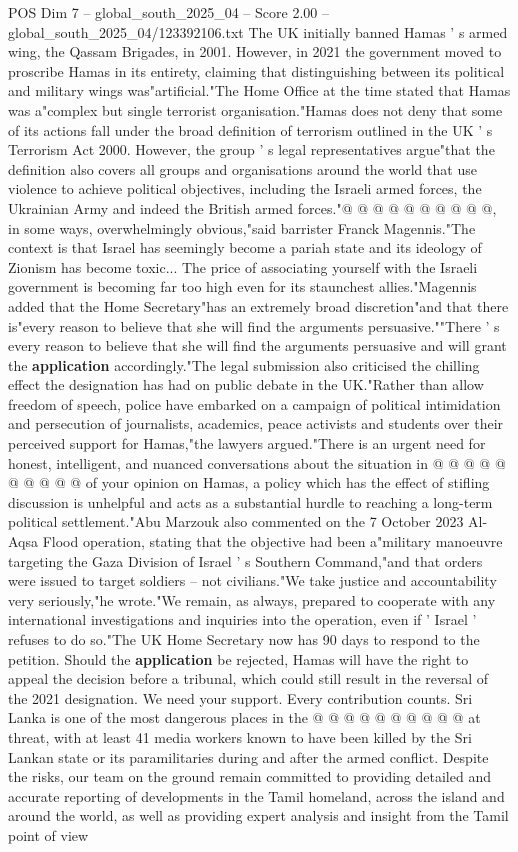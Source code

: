 \begin{textsample}{POS Dim 7 – global\_south\_2025\_04 – Score 2.00 – global\_south\_2025\_04/123392106.txt}
The UK initially banned Hamas ' s armed wing, the Qassam Brigades, in 2001.
However, in 2021 the government moved to proscribe Hamas in its entirety, claiming that distinguishing between its political and military wings was"artificial."The Home Office at the time stated that Hamas was a"complex but single terrorist organisation."Hamas does not deny that some of its actions fall under the broad definition of terrorism outlined in the UK ' s Terrorism Act 2000.
However, the group ' s legal representatives argue"that the definition also covers all groups and organisations around the world that use violence to achieve political objectives, including the Israeli armed forces, the Ukrainian Army and indeed the British armed forces."@ @ @ @ @ @ @ @ @ @, in some ways, overwhelmingly obvious,"said barrister Franck Magennis."The context is that Israel has seemingly become a pariah state and its ideology of Zionism has become toxic...
The price of associating yourself with the Israeli government is becoming far too high even for its staunchest allies."Magennis added that the Home Secretary"has an extremely broad discretion"and that there is"every reason to believe that she will find the arguments persuasive.""There ' s every reason to believe that she will find the arguments persuasive and will grant the \textbf{application} accordingly."The legal submission also criticised the chilling effect the designation has had on public debate in the UK."Rather than allow freedom of speech, police have embarked on a campaign of political intimidation and persecution of journalists, academics, peace activists and students over their perceived support for Hamas,"the lawyers argued."There is an urgent need for honest, intelligent, and nuanced conversations about the situation in @ @ @ @ @ @ @ @ @ @ of your opinion on Hamas, a policy which has the effect of stifling discussion is unhelpful and acts as a substantial hurdle to reaching a long-term political settlement."Abu Marzouk also commented on the 7 October 2023 Al-Aqsa Flood operation, stating that the objective had been a"military manoeuvre targeting the Gaza Division of Israel ' s Southern Command,"and that orders were issued to target soldiers -- not civilians."We take justice and accountability very seriously,"he wrote."We remain, as always, prepared to cooperate with any international investigations and inquiries into the operation, even if ' Israel ' refuses to do so."The UK Home Secretary now has 90 days to respond to the petition.
Should the \textbf{application} be rejected, Hamas will have the right to appeal the decision before a tribunal, which could still result in the reversal of the 2021 designation.
We need your support.
Every contribution counts.
Sri Lanka is one of the most dangerous places in the @ @ @ @ @ @ @ @ @ @ at threat, with at least 41 media workers known to have been killed by the Sri Lankan state or its paramilitaries during and after the armed conflict.
Despite the risks, our team on the ground remain committed to providing detailed and accurate reporting of developments in the Tamil homeland, across the island and around the world, as well as providing expert analysis and insight from the Tamil point of view


\end{textsample}
